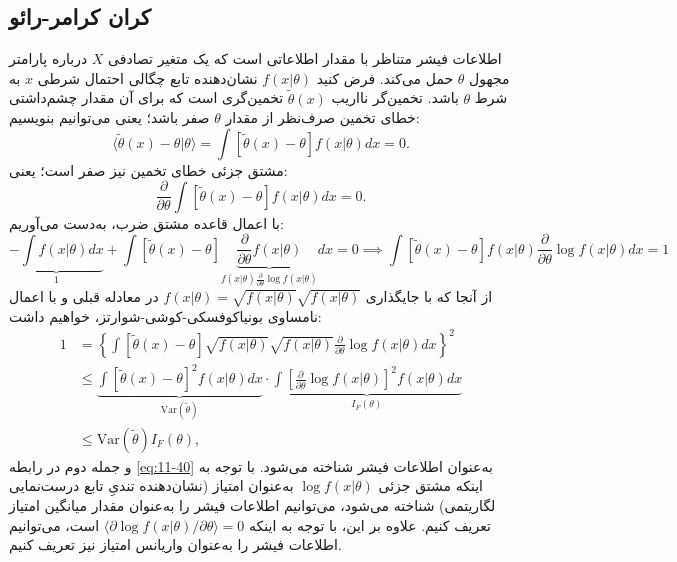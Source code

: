 \subsection{کران کرامر-رائو}
\label{subsec:11-2-1}
اطلاعات فیشر متناظر با مقدار اطلاعاتی است که یک متغیر تصادفی $X$ درباره پارامتر مجهول $\theta$ حمل می‌کند. فرض کنید $f(x|\theta)$ نشان‌دهنده تابع چگالی احتمال شرطی $x$ به شرط $\theta$ باشد. تخمین‌گر نااریب $\tilde{\theta}(x)$ تخمین‌گری است که برای آن مقدار چشم‌داشتی خطای تخمین صرف‌نظر از مقدار $\theta$ صفر باشد؛ یعنی می‌توانیم بنویسیم:
\begin{equation}
	\langle \tilde{\theta}(x) - \theta | \theta \rangle = \int [\tilde{\theta}(x) - \theta] f(x|\theta) dx = 0.
	\label{eq:11-37}
\end{equation}
مشتق جزئی خطای تخمین نیز صفر است؛ یعنی:
\begin{equation}
	\frac{\partial}{\partial \theta} \int [\tilde{\theta}(x) - \theta] f(x|\theta) dx = 0.
	\label{eq:11-38}
\end{equation}
با اعمال قاعده مشتق ضرب، به‌دست می‌آوریم:
\begin{equation}
	\underbrace{-\int f(x|\theta) dx}_{1} + \int [\tilde{\theta}(x) - \theta] \underbrace{\frac{\partial}{\partial \theta} f(x|\theta)}_{f(x|\theta) \frac{\partial}{\partial \theta} \log f(x|\theta)} dx = 0
	\implies \int [\tilde{\theta}(x) - \theta] f(x|\theta) \frac{\partial}{\partial \theta} \log f(x|\theta) dx = 1
	\label{eq:11-39}
\end{equation}
از آنجا که با جایگذاری $f(x|\theta) = \sqrt{f(x|\theta)} \sqrt{f(x|\theta)}$ در معادله قبلی و با اعمال نامساوی بونیاکوفسکی-کوشی-شوارتز، خواهیم داشت:
\begin{equation}
	\begin{aligned}
		1 &= \left\{ \int [\tilde{\theta}(x) - \theta] \sqrt{f(x|\theta)} \sqrt{f(x|\theta)} \frac{\partial}{\partial \theta} \log f(x|\theta) dx \right\}^2 \\
		&\leq \underbrace{\int [\tilde{\theta}(x) - \theta]^2 f(x|\theta) dx}_{\text{Var}(\tilde{\theta})} \cdot \underbrace{\int \left[ \frac{\partial}{\partial \theta} \log f(x|\theta) \right]^2 f(x|\theta) dx}_{I_F(\theta)} \\
		&\leq \text{Var}(\tilde{\theta}) I_F(\theta),
	\end{aligned}
	\label{eq:11-40}
\end{equation}
و جمله دوم در رابطه \eqref{eq:11-40} به‌عنوان اطلاعات فیشر شناخته می‌شود. با توجه به اینکه مشتق جزئی $\log f(x|\theta)$ به‌عنوان امتیاز (نشان‌دهنده تندیِ تابع درست‌نمایی لگاریتمی) شناخته می‌شود، می‌توانیم اطلاعات فیشر را به‌عنوان مقدار میانگین امتیاز تعریف کنیم. علاوه بر این، با توجه به اینکه $\langle \partial \log f(x|\theta) / \partial \theta \rangle = 0$ است، می‌توانیم اطلاعات فیشر را به‌عنوان واریانس امتیاز نیز تعریف کنیم.

